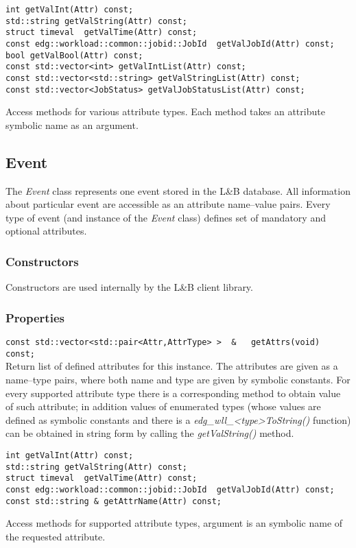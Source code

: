 \documentclass{egee}
\def\LB{L\&B\xspace}
\begin{document}
\begin{description}

\item{
\begin{verbatim}
int	getValInt(Attr) const;
std::string getValString(Attr) const;
struct timeval	getValTime(Attr) const;
const edg::workload::common::jobid::JobId  getValJobId(Attr) const;
bool getValBool(Attr) const;
const std::vector<int> getValIntList(Attr) const;
const std::vector<std::string> getValStringList(Attr) const;
const std::vector<JobStatus> getValJobStatusList(Attr) const;
\end{verbatim}
}
Access methods for various attribute types. Each method takes an
attribute symbolic name as an argument. 

\end{description}

\subsection*{Event}
The \emph{Event} class represents one event stored in the \LB
database. All information about particular event are accessible as an
attribute name--value pairs. Every type of event (and instance of the 
\emph{Event} class) defines set of mandatory and optional attributes.


\subsubsection*{Constructors}
Constructors are used internally by the \LB client library.

\subsubsection*{Properties}

\begin{description}
\item{
\verb|const std::vector<std::pair<Attr,AttrType> >  &	getAttrs(void) const;|
}\\
Return list of defined attributes for this instance. The attributes
are given as a name--type pairs, where both name and type are given by
symbolic constants. For every supported attribute type there is a
corresponding method to obtain value of such attribute; in addition
values of enumerated types (whose values are defined as symbolic
constants and there is a \emph{edg\_wll\_<type>ToString()} function)
can be obtained in string form by calling the \emph{getValString()} method.

\item{
\begin{verbatim}
int	getValInt(Attr) const;
std::string getValString(Attr) const;
struct timeval	getValTime(Attr) const;
const edg::workload::common::jobid::JobId  getValJobId(Attr) const;
const std::string & getAttrName(Attr) const;
\end{verbatim}
}
Access methods for supported attribute types, argument is an symbolic
name of the requested attribute.

\end{description}
\end{document}
